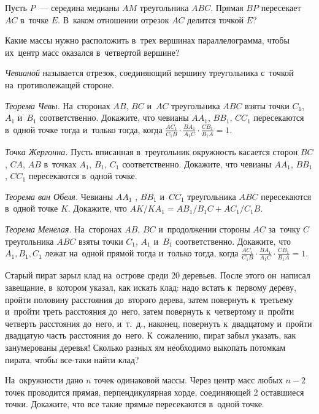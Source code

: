 \begin{problems}

\item
Пусть $P$~--- середина медианы $AM$ треугольника $ABC$.
Прямая $BP$ пересекает $AC$ в~точке $E$.
В~каком отношении отрезок $AC$ делится точкой $E$?

\item
Какие массы нужно расположить в~трех вершинах параллелограмма, чтобы их~центр
масс оказался в~четвертой вершине?

\end{problems}

\emph{Чевианой} называется отрезок, соединяющий вершину треугольника с~точкой
на~противолежащей стороне.

\begin{problems}

\item\emph{Теорема Чевы.}
На~сторонах $AB$, $BC$ и~$AC$ треугольника $ABC$ взяты точки
$C_1$, $A_1$ и~$B_1$ соответственно.
Докажите, что чевианы $A A_1$, $B B_1$, $C C_1$ пересекаются в~одной точке
тогда и~только тогда, когда
\(
    \frac{A C_1}{C_1 B} \cdot \frac{B A_1}{A_1 C} \cdot \frac{C B_1}{B_1 A}
=
    1
\).

\item\emph{Точка Жергонна.}
Пусть вписанная в~треугольник окружность касается сторон $BC$, $CA$, $AB$
в~точках $A_1$, $B_1$, $C_1$ соответственно.
Докажите, что чевианы $A A_1$, $B B_1$, $C C_1$ пересекаются в~одной точке.

\item\emph{Теорема ван Обеля.}
Чевианы $A A_1$ , $B B_1$ и~$C C_1$ треугольника $ABC$ пересекаются в~одной
точке $K$.
Докажите, что $A K / K A_1 =A B_1 / B_1 C + A C_1 / C_1 B$.

\item\emph{Теорема Менелая.}
На~сторонах $AB$, $BC$ и~продолжении стороны $AC$ за~точку $C$ треугольника
$ABC$ взяты точки $C_1$, $A_1$ и~$B_1$ соответственно.
Докажите, что $A_1, B_1, C_1$ лежат на~одной прямой тогда и~только тогда, когда
\(
    \frac{A C_1}{C_1 B} \cdot \frac{B A_1}{A_1 C} \cdot \frac{C B_1}{B_1 A}
=
    1
\).

\item
Старый пират зарыл клад на~острове среди $20$ деревьев.
После этого он~написал завещание, в~котором указал, как искать клад: надо
встать к~первому дереву, пройти половину расстояния до~второго дерева, затем
повернуть к~третьему и~пройти треть расстояния до~него, затем повернуть
к~четвертому и~пройти четверть расстояния до~него, и~т.~д., наконец, повернуть
к~двадцатому и~пройти двадцатую часть расстояния до~него.
К~сожалению, пират забыл указать, как занумерованы деревья!
Сколько разных ям необходимо выкопать потомкам пирата, чтобы все-таки найти
клад?

\item
На~окружности дано $n$ точек одинаковой массы.
Через центр масс любых $n - 2$ точек проводится прямая, перпендикулярная хорде,
соединяющей 2 оставшиеся точки.
Докажите, что все такие прямые пересекаются в~одной точке.

\end{problems}

\endgroup %

